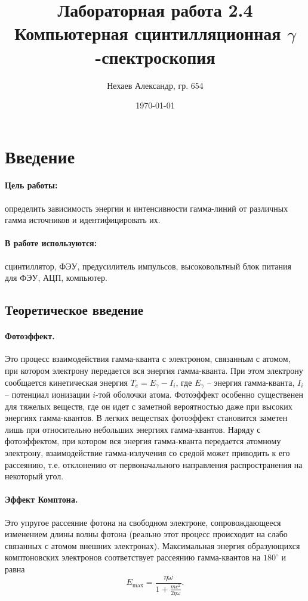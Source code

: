 \documentclass[a4paper, 12pt]{article}
\title{Лабораторная работа 2.4\\Компьютерная сцинтилляционная $\gamma$-спектроскопия}
\author{Нехаев Александр, гр. 654}
\date{\today}
\begin{document}
\maketitle
\tableofcontents
\section{Введение}
\paragraph{Цель работы:}
определить зависимость энергии и интенсивности гамма-линий от различных гамма источников и идентифицировать их.
\paragraph{В работе используются:}
сцинтиллятор, ФЭУ, предусилитель импульсов, высоковольтный блок питания для ФЭУ, АЦП, компьютер.
\subsection{Теоретическое введение}
\paragraph{Фотоэффект.}
Это процесс взаимодействия гамма-кванта с электроном, связанным с атомом, при котором электрону передается вся энергия гамма-кванта. При этом электрону сообщается кинетическая энергия $T_e=E_\gamma-I_i$, где $E_\gamma$ -- энергия гамма-кванта, $I_i$ -- потенциал ионизации $i$-той оболочки атома. Фотоэффект особенно существенен для тяжелых веществ, где он идет с заметной вероятностью даже при высоких энергиях гамма-квантов. В легких веществах фотоэффект становится заметен лишь при относительно небольших энергиях гамма-квантов. Наряду с фотоэффектом, при котором вся энергия гамма-кванта передается атомному электрону, взаимодействие гамма-излучения со средой может приводить к его рассеянию, т.е. отклонению от первоначального направления распространения на некоторый угол.
\paragraph{Эффект Комптона.} Это упругое рассеяние фотона на свободном электроне, сопровождающееся изменением длины волны фотона (реально этот процесс происходит на слабо связанных с атомом внешних электронах). Максимальная энергия образующихся комптоновских электронов соответствует рассеянию гамма-квантов на $180^\circ$ и равна
\begin{equation}
E_{\max}=\frac{\eta\omega}{1+\frac{mc^2}{2\eta\omega}}.
\end{equation}
\end{document}
